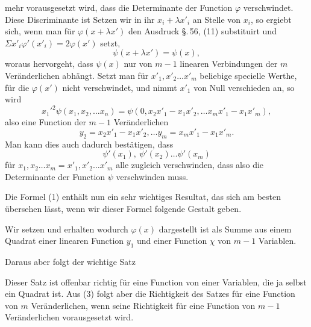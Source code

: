 mehr vorausgesetzt wird, dass die Determinante der Function $\varphi$
verschwindet. Diese Discriminante ist
Setzen wir in ihr $x_i + \lambda x'_i$ an Stelle von $x_i$, so ergiebt sich,
wenn man f\"ur $\varphi(x + \lambda x')$ den Ausdruck \S.\,56, (11) substituirt
und $\Sigma x'_i \varphi'(x'_i) = 2\varphi(x')$ setzt,
\[
\psi(x + \lambda x') = \psi(x),
\]
woraus hervorgeht, dass $\psi(x)$ nur von $m - 1$ linearen Verbindungen
 der $m$ Ver\"anderlichen abh\"angt. Setzt man f\"ur $x'_1, x'_2 \ldots x'_m$
beliebige specielle Werthe, f\"ur die $\varphi(x')$ nicht verschwindet, und
nimmt $x'_1$ von Null verschieden an, so wird
\[
x_1'^2 \psi(x_1, x_2, \ldots x_n) = \psi(0, x_2 x'_1 - x_1 x'_2, \ldots x_m x'_1 - x_1 x'_m),
\]
also eine Function der $m - 1$ Ver\"anderlichen
\[
y_2 = x_2 x'_1 - x_1 x'_2, \ldots y_m = x_m x'_1 - x_1 x'_m.
\]
Man kann dies auch dadurch best\"atigen, dass
\[
\psi'(x_1), \ \psi'(x_2) \ldots \psi'(x_m)
\]
f\"ur $x_1, x_2 \ldots x_m = x'_1, x'_2 \ldots x'_m$ alle zugleich verschwinden,
dass also die Determinante der Function $\psi$ verschwinden muss.

Die Formel (1) enth\"alt nun ein sehr wichtiges Resultat, das
sich am besten \"ubersehen l\"asst, wenn wir dieser Formel folgende
Gestalt geben.

Wir setzen
und erhalten
wodurch $\varphi(x)$ dargestellt ist als Summe aus einem Quadrat einer
linearen Function $y_1$ und einer Function $\chi$ von $m - 1$ Variablen.

Daraus aber folgt der wichtige Satz


Dieser Satz ist offenbar richtig f\"ur eine Function von einer
Variablen, die ja selbst ein Quadrat ist. Aus (3) folgt aber die
Richtigkeit des Satzes f\"ur eine Function von $m$ Ver\"anderlichen,
wenn seine Richtigkeit f\"ur eine Function von $m - 1$ Ver\"anderlichen
 vorausgesetzt wird.
